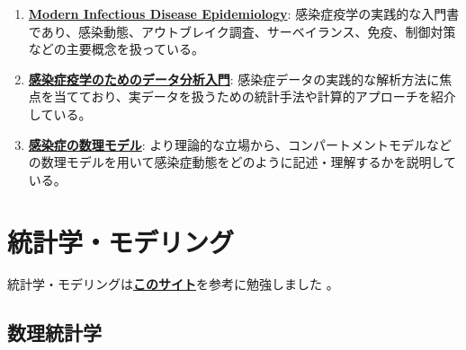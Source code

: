 \documentclass[uplatex]{jsarticle} %
\begin{document}
\begin{enumerate}
\item \href{https://www.routledge.com/Modern-Infectious-Disease-Epidemiology/Giesecke/p/book/9781444180022}{\textbf{Modern Infectious Disease Epidemiology}}: 
感染症疫学の実践的な入門書であり、感染動態、アウトブレイク調査、サーベイランス、免疫、制御対策などの主要概念を扱っている。

\item \href{https://store.isho.jp/search/detail/productId/2105621490}{\textbf{感染症疫学のためのデータ分析入門}}: 
感染症データの実践的な解析方法に焦点を当てており、実データを扱うための統計手法や計算的アプローチを紹介している。

\item \href{https://www.amazon.co.jp/dp/4563011673}{\textbf{感染症の数理モデル}}: 
より理論的な立場から、コンパートメントモデルなどの数理モデルを用いて感染症動態をどのように記述・理解するかを説明している。
\end{enumerate}

\section{統計学・モデリング}

統計学・モデリングは\href{https://qiita.com/ssugasawa/items/0e0d76de3ed92c7410e6}{\textbf{このサイト}}を参考に勉強しました 。

\subsection{数理統計学}
\end{document}
